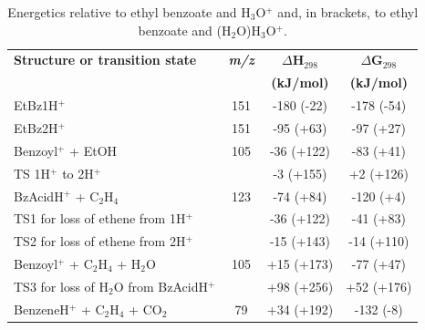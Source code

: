 \begin{table}[htbp]
\centering
\caption{Energetics relative to ethyl benzoate and H$_3$O$^+$ and, in brackets, to ethyl benzoate and (H$_2$O)H$_3$O$^+$. }
\label{tb:eb2}
\begin{tabular}{lccc}
\toprule
\textbf{Structure or transition state}	&\textbf{\textit{m/z} } &\textbf{$\Delta$H$_{298}$} &\textbf{$\Delta$G$_{298}$}\\
& &	\textbf{(kJ/mol)} &\textbf{(kJ/mol)} \\  \toprule
EtBz1H$^+$   					&	151	& -180 (-22)  & -178 (-54)   \\ \midrule
EtBz2H$^+$   					&	151	& -95 (+63)  & -97 (+27)   \\ \midrule
Benzoyl$^+$  + EtOH				&	105	& -36 (+122)  & -83 (+41)   \\ \midrule
TS 1H$^+$ to 2H$^+$		&		& -3 (+155)  & +2 (+126)   \\ \midrule
BzAcidH$^+$ + C$_2$H$_4$	&	123	& -74 (+84)  & -120 (+4)   \\ \midrule
TS1 for loss of ethene from 1H$^+$	&		& -36 (+122)  & -41 (+83)   \\ \midrule
TS2 for loss of ethene from 2H$^+$	&		& -15 (+143)  & -14 (+110)   \\ \midrule
Benzoyl$^+$  + C$_2$H$_4$ + H$_2$O	&	105	& +15 (+173)  & -77 (+47)  \\ \midrule
TS3 for loss of H$_2$O from BzAcidH$^+$&	& +98 (+256)  & +52 (+176)   \\ \midrule
BenzeneH$^+$ + C$_2$H$_4$ + CO$_2$	 &	79	& +34 (+192)  & -132 (-8)  \\ 
\bottomrule
\end{tabular}
\end{table}


